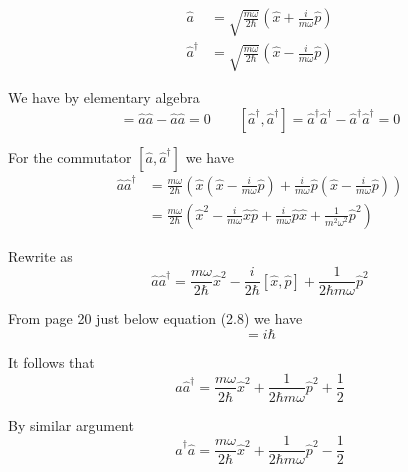 


\bigskip
\begin{align*}
\hat a&=\sqrt{\frac{m\omega}{2\hbar}}
\left(\hat x+\frac{i}{m\omega}\hat p\right)
\tag{2.9}
\\
\hat a^\dag&=\sqrt{\frac{m\omega}{2\hbar}}
\left(\hat x-\frac{i}{m\omega}\hat p\right)
\tag{2.10}
\end{align*}

We have by elementary algebra
\begin{equation*}
[\hat a,\hat a]=\hat a\hat a-\hat a\hat a=0
\qquad
[\hat a^\dag,\hat a^\dag]=\hat a^\dag\hat a^\dag-\hat a^\dag\hat a^\dag=0
\end{equation*}

For the commutator $[\hat a,\hat a^\dag]$ we have
\begin{align*}
\hat a\hat a^\dag
&=\frac{m\omega}{2\hbar}
\left(
\hat x\left(\hat x-\frac{i}{m\omega}\hat p\right)
+\frac{i}{m\omega}\hat p\left(\hat x-\frac{i}{m\omega}\hat p\right)
\right)
\\
&=\frac{m\omega}{2\hbar}
\left(
\hat x^2-\frac{i}{m\omega}\hat x\hat p+\frac{i}{m\omega}\hat p\hat x+\frac{1}{m^2\omega^2}\hat p^2\right)
\end{align*}

Rewrite as
\begin{equation*}
\hat a\hat a^\dag
=\frac{m\omega}{2\hbar}\hat x^2-\frac{i}{2\hbar}[\hat x,\hat p]+\frac{1}{2\hbar m\omega}\hat p^2
\end{equation*}

From page 20 just below equation (2.8) we have
\begin{equation*}
[\hat x,\hat p]=i\hbar
\end{equation*}

It follows that
\begin{equation*}
\hat a\hat a^\dag
=\frac{m\omega}{2\hbar}\hat x^2+\frac{1}{2\hbar m\omega}\hat p^2+\frac{1}{2}
\tag{1}
\end{equation*}

By similar argument
\begin{equation*}
\hat a^\dag\hat a
=\frac{m\omega}{2\hbar}\hat x^2+\frac{1}{2\hbar m\omega}\hat p^2-\frac{1}{2}
\tag{2}
\end{equation*}

